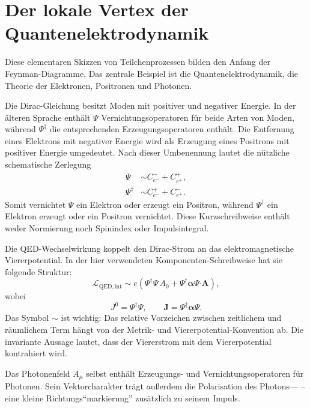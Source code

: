 \section{Der lokale Vertex der Quantenelektrodynamik}

Diese elementaren Skizzen von Teilchenprozessen bilden den Anfang der Feynman-Diagramme. Das zentrale Beispiel ist die Quantenelektrodynamik, die Theorie der Elektronen, Positronen und Photonen.

Die Dirac-Gleichung besitzt Moden mit positiver und negativer Energie. In der älteren Sprache enthält \(\Psi\) Vernichtungsoperatoren für beide Arten von Moden, während \(\Psi^\dagger\) die entsprechenden Erzeugungsoperatoren enthält. Die Entfernung eines Elektrons mit negativer Energie wird als Erzeugung eines Positrons mit positiver Energie umgedeutet. Nach dieser Umbenennung lautet die nützliche schematische Zerlegung
\begin{align}
\Psi
&\sim
C^-_{e^-}+C^+_{e^+},
\\
\Psi^\dagger
&\sim
C^+_{e^-}+C^-_{e^+}.
\end{align}
Somit vernichtet \(\Psi\) ein Elektron oder erzeugt ein Positron, während \(\Psi^\dagger\) ein Elektron erzeugt oder ein Positron vernichtet. Diese Kurzschreibweise enthält weder Normierung noch Spinindex oder Impulsintegral.

Die QED-Wechselwirkung koppelt den Dirac-Strom an das elektromagnetische Viererpotential. In der hier verwendeten Komponenten-Schreibweise hat sie folgende Struktur:
\begin{equation}
\mathcal L_{\mathrm{QED,int}}
\sim
e\left(
\Psi^\dagger\Psi\,A_0
+
\Psi^\dagger\boldsymbol{\alpha}\Psi\mathbin{\boldsymbol{\cdot}}\mathbf A
\right),
\end{equation}
wobei
\begin{equation}
J^0=\Psi^\dagger\Psi,
\qquad
\mathbf J=\Psi^\dagger\boldsymbol{\alpha}\Psi.
\end{equation}
Das Symbol \(\sim\) ist wichtig: Das relative Vorzeichen zwischen zeitlichem und räumlichem Term hängt von der Metrik- und Viererpotential-Konvention ab. Die invariante Aussage lautet, dass der Viererstrom mit dem Viererpotential kontrahiert wird.

Das Photonenfeld \(A_\mu\) selbst enthält Erzeugungs- und Vernichtungsoperatoren für Photonen. Sein Vektorcharakter trägt außerdem die Polarisation des Photons--- – eine kleine Richtungs``markierung'' zusätzlich zu seinem Impuls.

